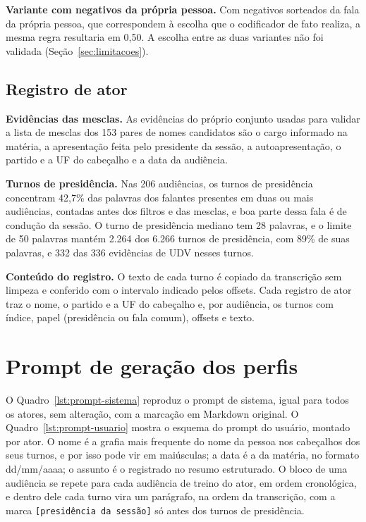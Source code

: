 \textbf{Variante com negativos da própria pessoa.} Com negativos sorteados da fala da própria pessoa,
que correspondem à escolha que o codificador de fato realiza, a mesma regra resultaria em 0,50. A
escolha entre as duas variantes não foi validada (Seção~\ref{sec:limitacoes}).

\subsection{Registro de ator}
\label{ap:regras-atores}

\textbf{Evidências das mesclas.} As evidências do próprio conjunto usadas para validar a lista de
mesclas dos 153 pares de nomes candidatos são o cargo informado na matéria, a apresentação feita pelo
presidente da sessão, a autoapresentação, o partido e a UF do cabeçalho e a data da audiência.

\textbf{Turnos de presidência.} Nas 206 audiências, os turnos de presidência concentram 42,7\% das
palavras dos falantes presentes em duas ou mais audiências, contadas antes dos filtros e das mesclas,
e boa parte dessa fala é de condução da sessão. O turno de presidência mediano tem 28 palavras, e o
limite de 50 palavras mantém 2.264 dos 6.266 turnos de presidência, com 89\% de suas palavras, e 332
das 336 evidências de UDV nesses turnos.

\textbf{Conteúdo do registro.} O texto de cada turno é copiado da transcrição sem limpeza e conferido
com o intervalo indicado pelos offsets. Cada registro de ator traz o nome, o partido e a UF do
cabeçalho e, por audiência, os turnos com índice, papel (presidência ou fala comum), offsets e texto.

\section{Prompt de geração dos perfis}
\label{ap:prompt}

O Quadro~\ref{lst:prompt-sistema} reproduz o prompt de sistema, igual para todos os atores, sem
alteração, com a marcação em Markdown original. O Quadro~\ref{lst:prompt-usuario} mostra o esquema do
prompt do usuário, montado por ator. O nome é a grafia mais frequente do nome da pessoa nos cabeçalhos
dos seus turnos, e por isso pode vir em maiúsculas; a data é a da matéria, no formato dd/mm/aaaa; o
assunto é o registrado no resumo estruturado. O bloco de uma audiência se repete para cada audiência de treino do ator,
em ordem cronológica, e dentro dele cada turno vira um parágrafo, na ordem da transcrição, com a marca
\texttt{[presidência da sessão]} só antes dos turnos de presidência.

